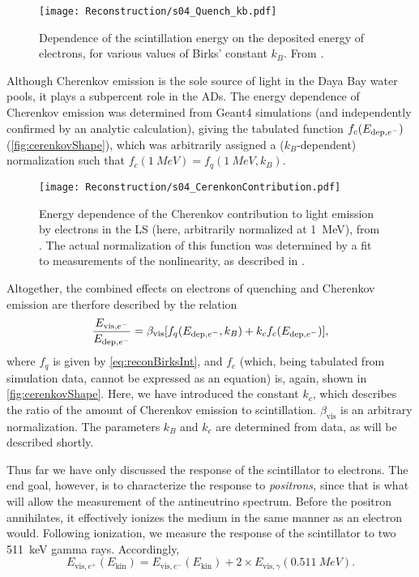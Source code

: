 \documentclass[../thesis.tex]{subfiles}
\begin{document}
\begin{figure}[h]
  \texttt{[image: Reconstruction/s04\_Quench\_kb.pdf]}
  \caption{Dependence of the scintillation energy on the deposited energy of electrons, for various values of Birks' constant $k_B$. From \cite{NonlinearityPaper}.}
  \label{fig:reconBirksInt}
\end{figure}

Although Cherenkov emission is the sole source of light in the Daya Bay water pools, it plays a subpercent role in the ADs. The energy dependence of Cherenkov emission was determined from Geant4 simulations (and independently confirmed by an analytic calculation), giving the tabulated function $f_c(E_{\mathrm{dep},e^-})$ (\autoref{fig:cerenkovShape}), which was arbitrarily assigned a ($k_B$-dependent) normalization such that $f_c(\SI{1}{MeV}) = f_q(\SI{1}{MeV}, k_B)$. 

\begin{figure}[h]
  \texttt{[image: Reconstruction/s04\_CerenkonContribution.pdf]}
  \caption{Energy dependence of the Cherenkov contribution to light emission by electrons in the LS (here, arbitrarily normalized at 1~MeV), from \cite{NonlinearityPaper}. The actual normalization of this function was determined by a fit to measurements of the nonlinearity, as described in \cite{NonlinearityPaper}.}
  \label{fig:cerenkovShape}
\end{figure}

Altogether, the combined effects on electrons of quenching and Cherenkov emission are therfore described by the relation
\begin{equation}
  \label{eq:reconScintNonlin}
  \frac{E_{\mathrm{vis},e^-}}{E_{\mathrm{dep},e^-}} = \beta_{\mathrm{vis}}[f_q(E_{\mathrm{dep},e^-}, k_B) + k_c f_c(E_{\mathrm{dep},e^-})],
\end{equation}
where $f_q$ is given by \autoref{eq:reconBirksInt}, and $f_c$ (which, being tabulated from simulation data, cannot be expressed as an equation) is, again, shown in \autoref{fig:cerenkovShape}. Here, we have introduced the constant $k_c$, which describes the ratio of the amount of Cherenkov emission to scintillation. $\beta_{\mathrm{vis}}$ is an arbitrary normalization. The parameters $k_B$ and $k_c$ are determined from data, as will be described shortly.

Thus far we have only discussed the response of the scintillator to electrons. The end goal, however, is to characterize the response to \emph{positrons,} since that is what will allow the measurement of the antineutrino spectrum. Before the positron annihilates, it effectively ionizes the medium in the same manner as an electron would. Following ionization, we measure the response of the scintillator to two 511~keV gamma rays. Accordingly,
\begin{equation}
  \label{eq:reconScintPositron}
  E_{\mathrm{vis},e^+}(E_{\mathrm{kin}}) = E_{\mathrm{vis},e^-}(E_{\mathrm{kin}}) + 2 \times E_{\mathrm{vis},\gamma}(\SI{0.511}{MeV}).
\end{equation}
\end{document}

